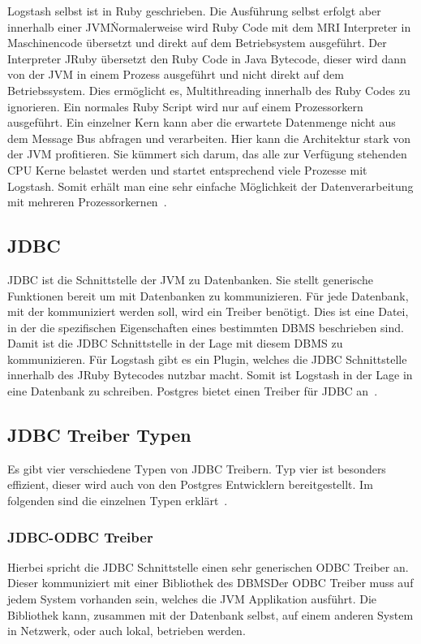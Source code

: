 Logstash selbst ist in Ruby geschrieben. Die Ausführung selbst erfolgt aber
innerhalb einer JVM\. Normalerweise wird Ruby Code mit dem MRI Interpreter in
Maschinencode übersetzt und direkt auf dem Betriebsystem ausgeführt. Der
Interpreter JRuby übersetzt den Ruby Code in Java Bytecode, dieser wird dann
von der JVM in einem Prozess ausgeführt und nicht direkt auf dem
Betriebssystem. Dies ermöglicht es, Multithreading innerhalb des Ruby Codes zu
ignorieren. Ein normales Ruby Script wird nur auf einem Prozessorkern
ausgeführt. Ein einzelner Kern kann aber die erwartete Datenmenge nicht aus dem
Message Bus abfragen und verarbeiten. Hier kann die Architektur stark von der
JVM profitieren. Sie kümmert sich darum, das alle zur Verfügung stehenden CPU
Kerne belastet werden und startet entsprechend viele Prozesse mit Logstash.
Somit erhält man eine sehr einfache Möglichkeit der Datenverarbeitung mit
mehreren Prozessorkernen~\cite{jruby}.
\tm%

\subsection{JDBC}
\gls{JDBC} ist die Schnittstelle der JVM zu Datenbanken. Sie stellt generische
Funktionen bereit um mit Datenbanken zu kommunizieren. Für jede Datenbank, mit
der kommuniziert werden soll, wird ein Treiber benötigt. Dies ist eine Datei,
in der die spezifischen Eigenschaften eines bestimmten \gls{DBMS} beschrieben
sind. Damit ist die JDBC Schnittstelle in der Lage mit diesem DBMS zu
kommunizieren. Für Logstash gibt es ein Plugin, welches die JDBC Schnittstelle
innerhalb des JRuby Bytecodes nutzbar macht. Somit ist Logstash in der Lage in
eine Datenbank zu schreiben. Postgres bietet einen Treiber für JDBC
an~\cite{postgres-jdbc}.
\tm%

\subsection{JDBC Treiber Typen}
Es gibt vier verschiedene Typen von JDBC Treibern. Typ vier ist besonders
effizient, dieser wird auch von den Postgres Entwicklern bereitgestellt. Im
folgenden sind die einzelnen Typen erklärt~\cite{jdbc-types}.

\subsubsection{JDBC-ODBC Treiber}
Hierbei spricht die JDBC Schnittstelle einen sehr generischen \gls{ODBC}
Treiber an. Dieser kommuniziert mit einer Bibliothek des DBMS\. Der ODBC
Treiber muss auf jedem System vorhanden sein, welches die JVM Applikation
ausführt. Die Bibliothek kann, zusammen mit der Datenbank selbst, auf einem
anderen System in Netzwerk, oder auch lokal, betrieben werden.

